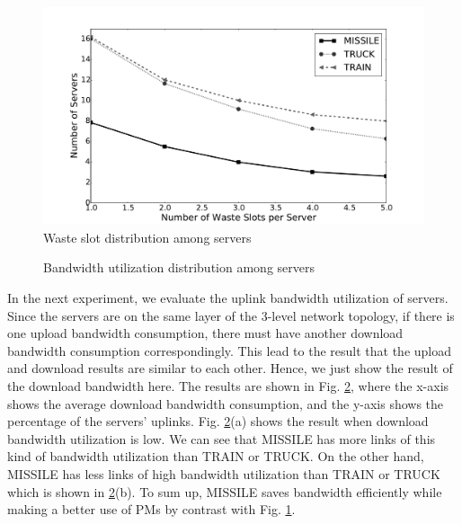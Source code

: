 \documentclass[10pt, conference, letterpaper]{IEEEtran}
\begin{document}
\begin{figure}
\center
    \includegraphics[width=2.8 in]{fig/BlankSlot.pdf}
    \caption{Waste slot distribution among servers}
    \label{fig:blankslot}
\end{figure}
\begin{figure}
  \centering
    \caption{Bandwidth utilization distribution among servers}
    \label{fig:blankbw}
\end{figure}

In the next experiment, we evaluate the uplink bandwidth utilization of servers. Since the servers are on the same layer of the 3-level network topology, if there is one upload bandwidth consumption, there must have another download bandwidth consumption correspondingly. This lead to the result that the upload and download results are similar to each other. Hence, we just show the result of the download bandwidth here. The results are shown in Fig. \ref{fig:blankbw}, where the x-axis shows the average download bandwidth consumption, and the y-axis shows the percentage of the servers' uplinks. Fig. \ref{fig:blankbw}(a) shows the result when download bandwidth utilization is low. We can see that MISSILE has more links of this kind of bandwidth utilization than TRAIN or TRUCK. On the other hand, MISSILE has less links of high bandwidth utilization than TRAIN or TRUCK which is shown in \ref{fig:blankbw}(b). To sum up, MISSILE saves bandwidth efficiently while making a better use of PMs by contrast with Fig. \ref{fig:blankslot}.
\end{document}
